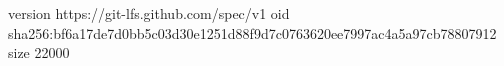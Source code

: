 version https://git-lfs.github.com/spec/v1
oid sha256:bf6a17de7d0bb5c03d30e1251d88f9d7c0763620ee7997ac4a5a97cb78807912
size 22000
